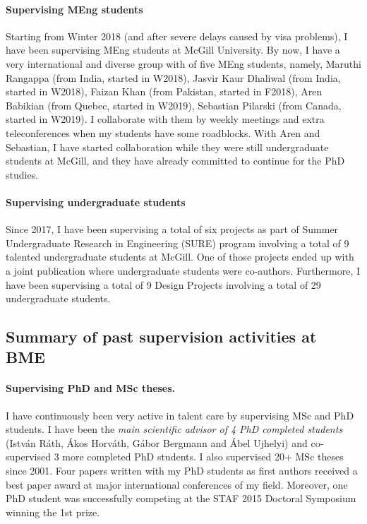 \paragraph{Supervising MEng students}
Starting from Winter 2018 (and after severe delays caused by visa problems), I have been supervising MEng students at McGill University. By now, I have a very international and diverse group with of five MEng students, namely, Maruthi Rangappa (from India, started in W2018), Jasvir Kaur Dhaliwal (from India, started in W2018), Faizan Khan (from Pakistan, started in F2018), Aren Babikian (from Quebec, started in W2019), Sebastian Pilarski (from Canada, started in W2019). I collaborate with them by weekly meetings and extra teleconferences when my students have some roadblocks. With Aren and Sebastian, I have started collaboration while they were still undergraduate students at McGill, and they have already committed to continue for the PhD studies.  

\paragraph{Supervising undergraduate students}
Since 2017, I have been supervising a total of six projects as part of Summer Undergraduate Research in Engineering (SURE) program involving a total of 9 talented undergraduate students at McGill. One of those projects ended up with a joint publication \cite{icse2019-tool} where undergraduate students were co-authors. Furthermore, I have been supervising a total of 9 Design Projects involving a total of 29 undergraduate students. 

\subsection{Summary of past supervision activities at BME}


\paragraph{Supervising PhD and MSc theses.}
I have continuously been very active in talent care by supervising MSc and PhD students. I have been the \emph{main scientific advisor of 4 PhD completed students} (István Ráth, Ákos Horváth, Gábor Bergmann and Ábel Ujhelyi) and co-supervised 3 more completed PhD students. I also supervised 20+ MSc theses since 2001. Four papers written with my PhD students as first authors received a best paper award at major international conferences of my field. Moreover, one PhD student was successfully competing at the STAF 2015 Doctoral Symposium winning the 1st prize. 


